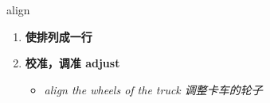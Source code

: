 
\begin{frame}
{\huge align}
\begin{center}
\begin{enumerate}\Large
  \item \textbf{使排列成一行}
  \item \textbf{校准，调准 adjust}
  \begin{itemize}
    \item \em{\Large{align the wheels of the truck 调整卡车的轮子}}
  \end{itemize}
\end{enumerate}
\end{center}
\end{frame}

